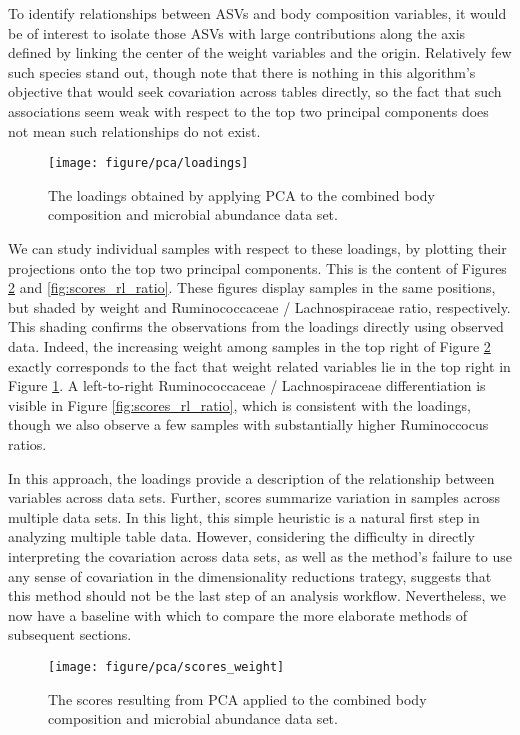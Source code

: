 \documentclass{article}
\begin{document}
To identify relationships between ASVs and body composition variables, it would
be of interest to isolate those ASVs with large contributions along the axis
defined by linking the center of the weight variables and the origin. Relatively
few such species stand out, though note that there is nothing in this
algorithm's objective that would seek covariation across tables directly, so the
fact that such associations seem weak with respect to the top two principal
components does not mean such relationships do not exist.

\begin{figure}[ht]
  \centering
  \texttt{[image: figure/pca/loadings]}
  \caption{The loadings obtained by applying PCA to the combined body
    composition and microbial abundance data set. \label{fig:loadings} }
\end{figure}

We can study individual samples with respect to these loadings, by plotting
their projections onto the top two principal components. This is the content of
Figures \ref{fig:scores_weight} and \ref{fig:scores_rl_ratio}. These figures
display samples in the same positions, but shaded by weight and Ruminococcaceae
/ Lachnospiraceae ratio, respectively. This shading confirms the observations
from the loadings directly using observed data. Indeed, the increasing weight
among samples in the top right of Figure \ref{fig:scores_weight} exactly
corresponds to the fact that weight related variables lie in the top right in
Figure \ref{fig:loadings}. A left-to-right Ruminococcaceae /
Lachnospiraceae differentiation is visible in Figure \ref{fig:scores_rl_ratio},
which is consistent with the loadings, though we also observe a few samples with
substantially higher Ruminoccocus ratios.

In this approach, the loadings provide a description of the relationship between
variables across data sets. Further, scores summarize variation in samples
across multiple data sets. In this light, this simple heuristic is a natural
first step in analyzing multiple table data. However, considering the difficulty
in directly interpreting the covariation across data sets, as well as the
method's failure to use any sense of covariation in the dimensionality
reductions trategy, suggests that this method should not be the last step of an
analysis workflow. Nevertheless, we now have a baseline with which to compare
the more elaborate methods of subsequent sections.

\begin{figure}[ht]
  \centering
  \texttt{[image: figure/pca/scores\_weight]}
  \caption{The scores resulting from PCA applied to the combined body
    composition and microbial abundance data set.\label{fig:scores_weight} }
\end{figure}
\end{document}
